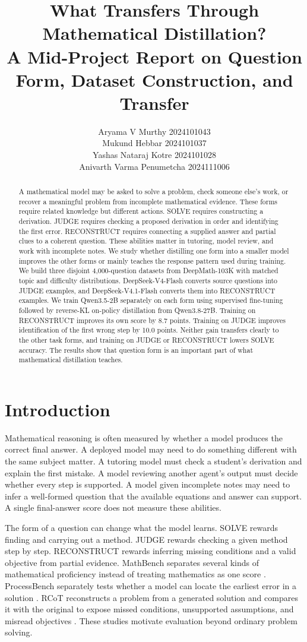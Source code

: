 \documentclass[11pt]{article}
\title{What Transfers Through Mathematical Distillation?\\
A Mid-Project Report on Question Form, Dataset Construction, and Transfer}
\author{Aryama V Murthy 2024101043 \\
  Mukund Hebbar 2024101037 \\
  Yashas Nataraj Kotre 2024101028 \\
  Anivarth Varma Penumetcha 2024111006}
\begin{document}
\maketitle

\begin{abstract}
A mathematical model may be asked to solve a problem, check someone else's work, or recover a meaningful problem from incomplete mathematical evidence. These forms require related knowledge but different actions. SOLVE requires constructing a derivation. JUDGE requires checking a proposed derivation in order and identifying the first error. RECONSTRUCT requires connecting a supplied answer and partial clues to a coherent question. These abilities matter in tutoring, model review, and work with incomplete notes. We study whether distilling one form into a smaller model improves the other forms or mainly teaches the response pattern used during training. We build three disjoint 4,000-question datasets from DeepMath-103K with matched topic and difficulty distributions. DeepSeek-V4-Flash converts source questions into JUDGE examples, and DeepSeek-V4.1-Flash converts them into RECONSTRUCT examples. We train Qwen3.5-2B separately on each form using supervised fine-tuning followed by reverse-KL on-policy distillation from Qwen3.8-27B. Training on RECONSTRUCT improves its own score by 8.7 points. Training on JUDGE improves identification of the first wrong step by 10.0 points. Neither gain transfers clearly to the other task forms, and training on JUDGE or RECONSTRUCT lowers SOLVE accuracy. The results show that question form is an important part of what mathematical distillation teaches.
\end{abstract}

\section{Introduction}

Mathematical reasoning is often measured by whether a model produces the correct final answer. A deployed model may need to do something different with the same subject matter. A tutoring model must check a student's derivation and explain the first mistake. A model reviewing another agent's output must decide whether every step is supported. A model given incomplete notes may need to infer a well-formed question that the available equations and answer can support. A single final-answer score does not measure these abilities.

The form of a question can change what the model learns. SOLVE rewards finding and carrying out a method. JUDGE rewards checking a given method step by step. RECONSTRUCT rewards inferring missing conditions and a valid objective from partial evidence. MathBench separates several kinds of mathematical proficiency instead of treating mathematics as one score \citep{liu2024mathbench}. ProcessBench separately tests whether a model can locate the earliest error in a solution \citep{zheng2025processbench}. RCoT reconstructs a problem from a generated solution and compares it with the original to expose missed conditions, unsupported assumptions, and misread objectives \citep{xue2023rcot}. These studies motivate evaluation beyond ordinary problem solving.
\end{document}
